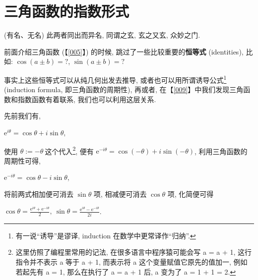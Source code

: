 \section{三角函数的指数形式}\label{010}

\begin{flushright}{\kaishu (有名、无名) 此两者同出而异名, 同谓之玄, 玄之又玄, 众妙之门.}\end{flushright}

前面介绍三角函数 (【\ref{005}】) 的时候, 跳过了一些比较重要的\textbf{恒等式}
(identities), 比如: $\cos (a\pm b)=?$, $\sin (a\pm  b)=?$

事实上这些恒等式可以从纯几何出发去推导,
或者也可以用所谓诱导公式\footnote{有一说``诱导''是谬译, induction
  在数学中更常译作``归纳''.} (induction formula, 即三角函数的周期性),
再或者, 在【\ref{009}】中我们发现三角函数和指数函数有着联系,
我们也可以利用这层关系.

\begin{tcolorbox}[size=fbox, breakable, enhanced jigsaw, title={三角函数的指数形式}]

先前我们有,

$\mathrm{e}^{i\theta}=\cos \theta+i\sin \theta$,

使用 $\theta:=-\theta\  $这个代入\footnote{这里仿照了编程里常用的记法,
  在很多语言中程序猿可能会写 a = a + 1, 这行指令并不表示 a 等于 a + 1,
  而表示将 a 这个变量赋值它原先的值加一, 例如若起先有 a = 1,
  那么在执行了 a = a + 1 后, a 变为了 a = 1 + 1 = 2.}, 便有
$\mathrm{e}^{-i\theta}=\cos (-\theta)+i\sin (-\theta)$,
利用三角函数的周期性可得,

$\mathrm{e}^{-i\theta}=\cos \theta-i\sin \theta$,

将前两式相加便可消去 $\sin\theta$ 项, 相减便可消去 $\cos\theta$ 项,
化简便可得

$\boxed{\cos\theta=\frac{\mathrm{e}^{i\theta}+\mathrm{e}^{-i\theta}}{2},\ \sin\theta=\frac{\mathrm{e}^{i\theta}-\mathrm{e}^{-i\theta}}{2i}}$.

\end{tcolorbox}

